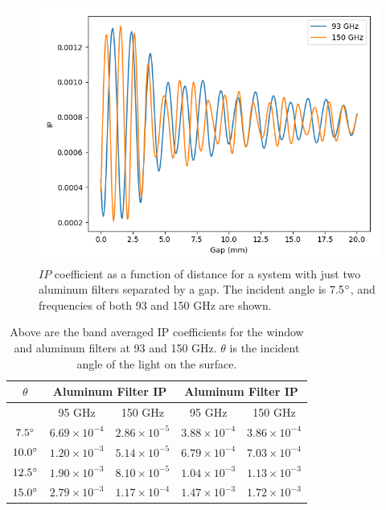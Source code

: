 \documentclass{article}
\theoremstyle{remark}
\begin{document}
\begin{figure}[t!]
	\centering
  \includegraphics[width=.8\linewidth]{ip_vs_gap_filter_only.png}
  \caption{$IP$ coefficient as a function of distance for a system with just two aluminum filters separated by a gap.
  The incident angle is 7.5$\degree$, and frequencies of both 93 and 150 GHz are shown.
  }
  \label{fig:IP_vs_distance}
\end{figure}



\begin{table}[h]
\centering

\begin{tabular}{|c|c|c|c|c|}
\hline
$\theta $       & \multicolumn{2}{|c|}{Aluminum Filter IP} & \multicolumn{2}{|c|}{Aluminum Filter IP}           \\
\hline
 & 95 GHz & 150 GHz & 95 GHz & 150 GHz\\
 \hline
$7.5   \degree$& $6.69 \times 10^{-4}$ & $2.86 \times 10^{-5}$ & $3.88 \times 10^{-4}$ & $3.86 \times 10^{-4}$ \\
$10.0  \degree$& $1.20 \times 10^{-3}$ & $5.14 \times 10^{-5}$ & $6.79 \times 10^{-4}$ & $7.03 \times 10^{-4}$ \\
$12.5  \degree$& $1.90 \times 10^{-3}$ & $8.10 \times 10^{-5}$ & $1.04 \times 10^{-3}$ & $1.13 \times 10^{-3}$ \\
$15.0  \degree$& $2.79 \times 10^{-3}$ & $1.17 \times 10^{-4}$ & $1.47 \times 10^{-3}$ & $1.72 \times 10^{-3}$ \\
\hline
\end{tabular}
\caption{ Above are the band averaged IP coefficients for the window and aluminum filters at 93 and 150 GHz. $\theta$ is the incident angle of the light
on the surface.
}
\label{table:IP_coeffs}
\end{table}
\end{document}
